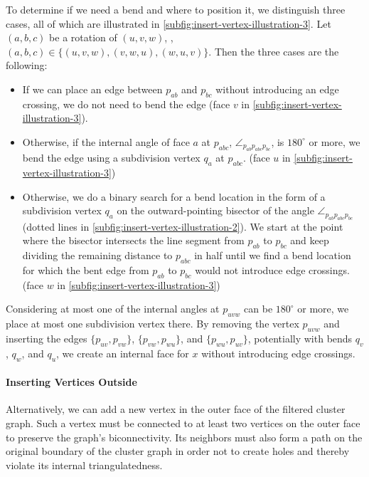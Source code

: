 To determine if we need a bend and where to position it, we distinguish three cases, all of which are illustrated in \cref{subfig:insert-vertex-illustration-3}.
Let $(a,b,c)$ be a rotation of $(u,v,w)$, \ie{}, $(a,b,c) \in \{(u,v,w), (v,w,u), (w,u,v)\}$.
Then the three cases are the following:
%
\begin{itemize}
\item If we can place an edge between $p_{ab}$ and $p_{bc}$ without introducing an edge crossing, we do not need to bend the edge (face $v$ in \cref{subfig:insert-vertex-illustration-3}).
\item Otherwise, if the internal angle of face $a$ at $p_{abc}$, $\angle_{p_{ab}p_{abc}p_{bc}}$, is $180^\circ$ or more, we bend the edge using a subdivision vertex $q_a$ at $p_{abc}$.
(face $u$ in \cref{subfig:insert-vertex-illustration-3})
\item Otherwise, we do a binary search for a bend location in the form of a subdivision vertex $q_a$ on the outward-pointing bisector of the angle $\angle_{p_{ab}p_{abc}p_{bc}}$ (dotted lines in \cref{subfig:insert-vertex-illustration-2}).
We start at the point where the bisector intersects the line segment from $p_{ab}$ to $p_{bc}$ and keep dividing the remaining distance to $p_{abc}$ in half until we find a bend location for which the bent edge from $p_{ab}$ to $p_{bc}$ would not introduce edge crossings.
(face $w$ in \cref{subfig:insert-vertex-illustration-3})
\end{itemize}

Considering at most one of the internal angles at $p_{uvw}$ can be $180^\circ$ or more, we place at most one subdivision vertex there.
By removing the vertex $p_{uvw}$ and inserting the edges $\{p_{uv},p_{vw}\}$, $\{p_{vw},p_{wu}\}$, and $\{p_{wu},p_{uv}\}$, potentially with bends $q_v$, $q_w$, and $q_u$, we create an internal face for $x$ without introducing edge crossings.



\paragraph{Inserting Vertices Outside}

Alternatively, we can add a new vertex in the outer face of the filtered cluster graph.
Such a vertex must be connected to at least two vertices on the outer face to preserve the graph's biconnectivity.
Its neighbors must also form a path on the original boundary of the cluster graph in order not to create holes and thereby violate its internal triangulatedness.


